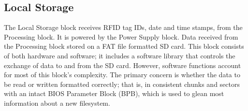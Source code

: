 \subsection{Local Storage}
The Local Storage block receives RFID tag IDs, date and time stamps, from the Processing block. It is powered by the Power Supply block. Data received from the Processing block \DIFdelbegin {}\DIFdelend \DIFaddbegin {}\DIFaddend stored on a FAT file formatted SD card. This block consists of both hardware and software; it includes a software library that controls the exchange of data to and from the SD card. However, software functions account for most of this block's complexity. The primary concern is whether the data to be read or written \DIFdelbegin {}\DIFdelend \DIFaddbegin {}\DIFaddend formatted correctly; that is, in consistent chunks and sectors with an intact BIOS Parameter Block (BPB), which is used to glean most information about a new filesystem.


% 